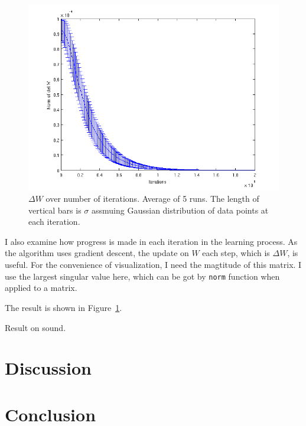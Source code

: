 \documentclass[10pt]{article}
\begin{document}
\begin{figure}
\centering
\includegraphics[width=.6\textwidth]{detW.png}
\caption{$\Delta W$ over number of iterations. Average of 5 runs. The
length of vertical bars is $\sigma$ assmuing Gaussian distribution of data
points at each iteration.}
\label{fig:detW}
\end{figure}

I also examine how progress is made in each iteration in the learning
process. As the algorithm uses gradient descent, the update on $W$ each
step, which is $\Delta W$, is useful. For the convenience of visualization,
I need the magtitude of this matrix. I use the largest singular value here,
which can be got by \texttt{norm} function when applied to a matrix.

The result is shown in Figure~\ref{fig:detW}.

Result on sound.

\section{Discussion}

\section{Conclusion}
\end{document}

